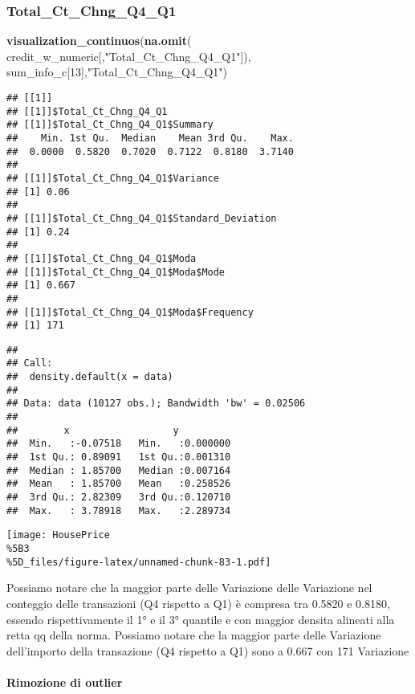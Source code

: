 \documentclass[
]{article}
\newenvironment{Shaded}{\begin{snugshade}}{\end{snugshade}}
\newcommand{\DecValTok}[1]{\textcolor[rgb]{0.00,0.00,0.81}{#1}}
\newcommand{\FunctionTok}[1]{\textcolor[rgb]{0.13,0.29,0.53}{\textbf{#1}}}
\newcommand{\NormalTok}[1]{#1}
\newcommand{\StringTok}[1]{\textcolor[rgb]{0.31,0.60,0.02}{#1}}
\begin{document}
\subsubsection{Total\_Ct\_Chng\_Q4\_Q1}\label{total_ct_chng_q4_q1}

\begin{Shaded}
\begin{Highlighting}[]
\FunctionTok{visualization\_continuos}\NormalTok{(}\FunctionTok{na.omit}\NormalTok{(}
\NormalTok{  credit\_w\_numeric[,}\StringTok{"Total\_Ct\_Chng\_Q4\_Q1"}\NormalTok{]), sum\_info\_c[}\DecValTok{13}\NormalTok{],}\StringTok{"Total\_Ct\_Chng\_Q4\_Q1"}\NormalTok{)}
\end{Highlighting}
\end{Shaded}

\begin{verbatim}
## [[1]]
## [[1]]$Total_Ct_Chng_Q4_Q1
## [[1]]$Total_Ct_Chng_Q4_Q1$Summary
##    Min. 1st Qu.  Median    Mean 3rd Qu.    Max. 
##  0.0000  0.5820  0.7020  0.7122  0.8180  3.7140 
## 
## [[1]]$Total_Ct_Chng_Q4_Q1$Variance
## [1] 0.06
## 
## [[1]]$Total_Ct_Chng_Q4_Q1$Standard_Deviation
## [1] 0.24
## 
## [[1]]$Total_Ct_Chng_Q4_Q1$Moda
## [[1]]$Total_Ct_Chng_Q4_Q1$Moda$Mode
## [1] 0.667
## 
## [[1]]$Total_Ct_Chng_Q4_Q1$Moda$Frequency
## [1] 171
\end{verbatim}

\begin{verbatim}
## 
## Call:
##  density.default(x = data)
## 
## Data: data (10127 obs.); Bandwidth 'bw' = 0.02506
## 
##        x                  y           
##  Min.   :-0.07518   Min.   :0.000000  
##  1st Qu.: 0.89091   1st Qu.:0.001310  
##  Median : 1.85700   Median :0.007164  
##  Mean   : 1.85700   Mean   :0.258526  
##  3rd Qu.: 2.82309   3rd Qu.:0.120710  
##  Max.   : 3.78918   Max.   :2.289734
\end{verbatim}

\texttt{[image: HousePrice\\\%5B3\\\%5D\_files/figure-latex/unnamed-chunk-83-1.pdf]}

Possiamo notare che la maggior parte delle Variazione delle Variazione
nel conteggio delle transazioni (Q4 rispetto a Q1) è compresa tra 0.5820
e 0.8180, essendo rispettivamente il 1° e il 3° quantile e con maggior
densita alineati alla retta qq della norma. Possiamo notare che la
maggior parte delle Variazione dell'importo della transazione (Q4
rispetto a Q1) sono a 0.667 con 171 Variazione

\paragraph{Rimozione di outlier}\label{rimozione-di-outlier-16}
\end{document}

